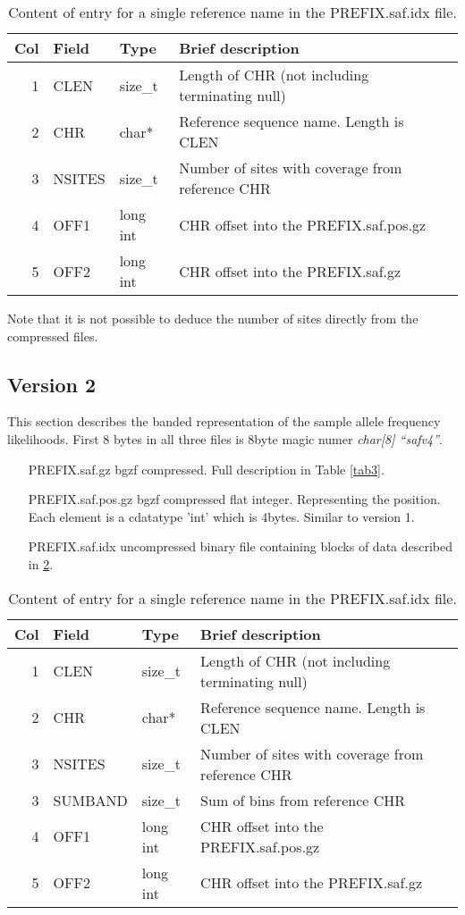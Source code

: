 \documentclass[10pt]{article}
\begin{document}
\begin{table}
\begin{tabular}{rllll}
  \hline
  {\bf Col} & {\bf Field} & {\bf Type} & {\bf Brief description} \\
  \hline
  1 & {\sf CLEN} & size\_t &  Length of CHR (not including terminating null)\\
  2 & {\sf CHR} & char* & Reference sequence name. Length is CLEN\\
  3 & {\sf NSITES} & size\_t & Number of sites with coverage from reference CHR\\
  4 & {\sf OFF1} & long int & CHR offset into the PREFIX.saf.pos.gz \\
  5 & {\sf OFF2} & long int & CHR offset into the PREFIX.saf.gz \\
  \hline
\end{tabular}\label{tab1}
\caption{Content of entry for a single reference name in the PREFIX.saf.idx file.}
\end{table}
 Note that it is not possible to deduce the number of sites directly
 from the compressed files.
\clearpage
\subsection{Version 2}
This section describes the banded representation of the sample allele frequency likelihoods.  First 8 bytes in all three files is 8byte magic numer \emph{char[8] ``safv4''}.  
\begin{itemize}
\item[PREFIX.saf.gz] bgzf compressed. Full description in Table \ref{tab3}.
\item[PREFIX.saf.pos.gz] bgzf compressed flat integer. Representing   the position. Each element is a cdatatype 'int' which is  4bytes. Similar to version 1.
\item[PREFIX.saf.idx] uncompressed binary file containing blocks of   data described in \ref{tab4}. 
\end{itemize}

\begin{table}[h]
\begin{tabular}{rllll}
  \hline
  {\bf Col} & {\bf Field} & {\bf Type} & {\bf Brief description} \\
  \hline
  1 & {\sf CLEN} & size\_t &  Length of CHR (not including terminating null)\\
  2 & {\sf CHR} & char* & Reference sequence name. Length is CLEN\\
  3 & {\sf NSITES} & size\_t & Number of sites with coverage from reference CHR\\
  3 & {\sf SUMBAND} & size\_t & Sum of bins from reference CHR\\
  4 & {\sf OFF1} & long int & CHR offset into the PREFIX.saf.pos.gz \\
  5 & {\sf OFF2} & long int & CHR offset into the PREFIX.saf.gz \\
  \hline
\end{tabular}\label{tab4}
\caption{Content of entry for a single reference name in the PREFIX.saf.idx file.}
\end{table}
\end{document}
